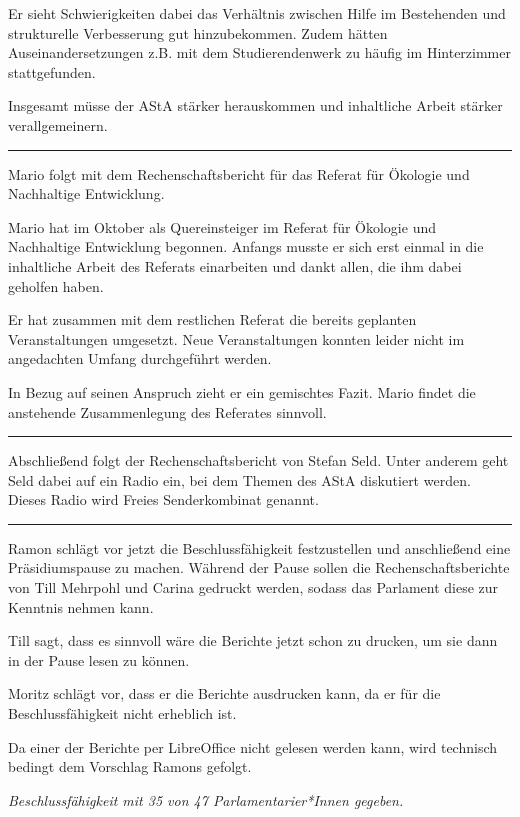\documentclass[ngerman,headheight=70pt]{scrartcl}
\begin{document}
    Er sieht Schwierigkeiten dabei das Verhältnis zwischen Hilfe im Bestehenden
    und strukturelle Verbesserung gut hinzubekommen. Zudem hätten
    Auseinandersetzungen z.B. mit dem Studierendenwerk zu häufig im Hinterzimmer
    stattgefunden.

    Insgesamt müsse der AStA stärker herauskommen und inhaltliche Arbeit
    stärker verallgemeinern.

    \hrule

    Mario folgt mit dem Rechenschaftsbericht für das Referat für Ökologie
    und Nachhaltige Entwicklung.

    Mario hat im Oktober als Quereinsteiger im Referat für Ökologie und
    Nachhaltige Entwicklung begonnen. Anfangs musste er sich erst einmal
    in die inhaltliche Arbeit des Referats einarbeiten und dankt allen,
    die ihm dabei geholfen haben.

    Er hat zusammen mit dem restlichen Referat die bereits geplanten Veranstaltungen
    umgesetzt. Neue Veranstaltungen konnten leider nicht im angedachten
    Umfang durchgeführt werden.

    In Bezug auf seinen Anspruch zieht er ein gemischtes Fazit. Mario findet
    die anstehende Zusammenlegung des Referates sinnvoll.

    \hrule

    Abschließend folgt der Rechenschaftsbericht von Stefan Seld.
    Unter anderem geht Seld dabei auf ein Radio ein, bei dem Themen des AStA
    diskutiert werden. Dieses Radio wird Freies Senderkombinat genannt.

    \hrule

    Ramon schlägt vor jetzt die Beschlussfähigkeit festzustellen und anschließend
    eine Präsidiumspause zu machen. Während der Pause sollen die Rechenschaftsberichte
    von Till Mehrpohl und Carina gedruckt werden, sodass das Parlament diese
    zur Kenntnis nehmen kann.

    Till sagt, dass es sinnvoll wäre die Berichte jetzt schon zu drucken, um sie
    dann in der Pause lesen zu können.

    Moritz schlägt vor, dass er die Berichte ausdrucken kann, da er für die
    Beschlussfähigkeit nicht erheblich ist.

    Da einer der Berichte per LibreOffice nicht gelesen werden kann,
    wird technisch bedingt dem Vorschlag Ramons gefolgt.

    \textit{Beschlussfähigkeit mit 35 von 47 Parlamentarier*Innen gegeben.}
\end{document}
